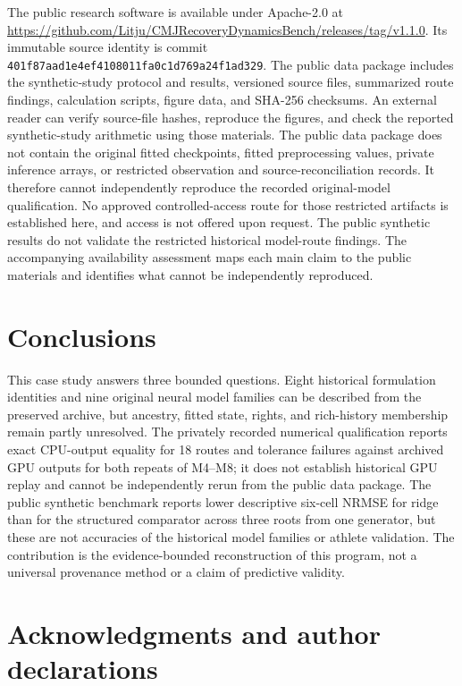 \documentclass[12pt,a4paper]{article}
\begin{document}
The public research software is available under Apache-2.0 at \url{https://github.com/Litju/CMJRecoveryDynamicsBench/releases/tag/v1.1.0}. Its immutable source identity is commit \texttt{401f87aa\allowbreak d1e4ef41\allowbreak 08011fa0\allowbreak c1d769a2\allowbreak 4f1ad329}. The public data package includes the synthetic-study protocol and results, versioned source files, summarized route findings, calculation scripts, figure data, and SHA-256 checksums. An external reader can verify source-file hashes, reproduce the figures, and check the reported synthetic-study arithmetic using those materials. The public data package does not contain the original fitted checkpoints, fitted preprocessing values, private inference arrays, or restricted observation and source-reconciliation records. It therefore cannot independently reproduce the recorded original-model qualification. No approved controlled-access route for those restricted artifacts is established here, and access is not offered upon request. The public synthetic results do not validate the restricted historical model-route findings. The accompanying availability assessment maps each main claim to the public materials and identifies what cannot be independently reproduced.

\section{Conclusions}

This case study answers three bounded questions. Eight historical formulation identities and nine original neural model families can be described from the preserved archive, but ancestry, fitted state, rights, and rich-history membership remain partly unresolved. The privately recorded numerical qualification reports exact CPU-output equality for 18 routes and tolerance failures against archived GPU outputs for both repeats of M4--M8; it does not establish historical GPU replay and cannot be independently rerun from the public data package. The public synthetic benchmark reports lower descriptive six-cell NRMSE for ridge than for the structured comparator across three roots from one generator, but these are not accuracies of the historical model families or athlete validation. The contribution is the evidence-bounded reconstruction of this program, not a universal provenance method or a claim of predictive validity.

\section*{Acknowledgments and author declarations}
\end{document}
